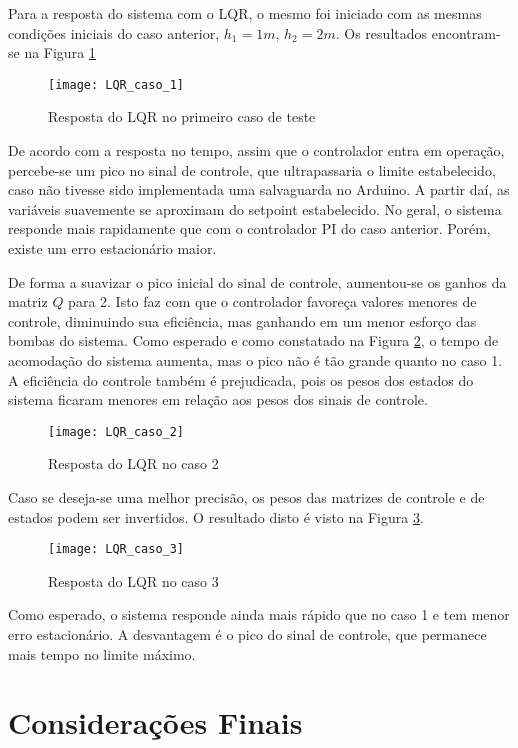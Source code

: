 Para a resposta do sistema com o LQR, o mesmo foi iniciado com as mesmas condições iniciais do caso anterior, $h_1 = 1m$, $h_2 = 2m$. Os resultados encontram-se na Figura \ref{img_lqr_caso_1}

\begin{figure}[htb]
	\centering
	\texttt{[image: LQR\_caso\_1]}
	\caption{Resposta do LQR no primeiro caso de teste}
	\label{img_lqr_caso_1}
\end{figure}

De acordo com a resposta no tempo, assim que o controlador entra em operação, percebe-se um pico no sinal de controle, que ultrapassaria o limite estabelecido, caso não tivesse sido implementada uma salvaguarda no Arduino. A partir daí, as variáveis suavemente se aproximam do setpoint estabelecido. No geral, o sistema responde mais rapidamente que com o controlador PI do caso anterior. Porém, existe um erro estacionário maior.

De forma a suavizar o pico inicial do sinal de controle, aumentou-se os ganhos da matriz $Q$ para 2. Isto faz com que o controlador favoreça valores menores de controle, diminuindo sua eficiência, mas ganhando em um menor esforço das bombas do sistema. Como esperado e como constatado na Figura \ref{img_lqr_caso_2}, o tempo de acomodação do sistema aumenta, mas o pico não é tão grande quanto no caso 1. A eficiência do controle também é prejudicada, pois os pesos dos estados do sistema ficaram menores em relação aos pesos dos sinais de controle.

\begin{figure}[!htb]
	\centering
	\texttt{[image: LQR\_caso\_2]}
	\caption{Resposta do LQR no caso 2}
	\label{img_lqr_caso_2}
\end{figure}

Caso se deseja-se uma melhor precisão, os pesos das matrizes de controle e de estados podem ser invertidos. O resultado disto é visto na Figura \ref{img_lqr_caso_3}.

\begin{figure}[!htb]
	\centering
	\texttt{[image: LQR\_caso\_3]}
	\caption{Resposta do LQR no caso 3}
	\label{img_lqr_caso_3}
\end{figure}

Como esperado, o sistema responde ainda mais rápido que no caso 1 e tem menor erro estacionário. A desvantagem é o pico do sinal de controle, que permanece mais tempo no limite máximo.

\section{Considerações Finais}

